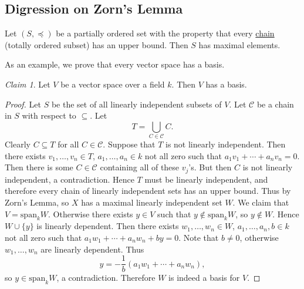 \documentclass[12pt]{article}
\theoremstyle{definition}
\theoremstyle{remark}
\newtheorem*{claim}{Claim}
\begin{document}
\subsection{Digression on Zorn's Lemma}
Let $(S,\preceq)$ be a partially ordered set with the property that every \underline{chain} (totally ordered subset) has an upper bound. Then $S$ has maximal elements.

As an example, we prove that every vector space has a basis. 
\begin{claim}
    Let $V$ be a vector space over a field $k$. Then $V$ has a basis.
\end{claim}
\begin{proof}
    Let $S$ be the set of all linearly independent subsets of $V$. Let $\mathcal{C}$ be a chain in $S$ with respect to $\subseteq$. Let 
    \begin{equation}
        T=\bigcup\limits_{C\in\mathcal{C}}C.
    \end{equation}
    Clearly $C\subseteq T$ for all $C\in\mathcal{C}$. Suppose that $T$ is not linearly independent. Then there exists $v_1,\dotsc,v_n\in T$, $a_1,\dotsc,a_n\in k$ not all zero such that $a_1v_1+\dotsb+a_nv_n=0$. Then there is some $C\in\mathcal{C}$ containing all of these $v_j$'s. But then $C$ is not linearly independent, a contradiction. Hence $T$ must be linearly independent, and therefore every chain of linearly independent sets has an upper bound. Thus by Zorn's Lemma, so $X$ has a maximal linearly independent set $W$. We claim that $V=\mathrm{span}_kW$. Otherwise there exists $y\in V$ such that $y\notin\mathrm{span}_kW$, so $y\notin W$. Hence $W\cup\{y\}$ is linearly dependent. Then there exists $w_1,\dotsc,w_n\in W$, $a_1,\dotsc,a_n,b\in k$ not all zero such that $a_1w_1+\dotsb+a_nw_n+by=0$. Note that $b\neq0$, otherwise $w_1,\dotsc,w_n$ are linearly dependent. Thus 
    \begin{equation}
        y=-\frac{1}{b}(a_1w_1+\dotsb+a_nw_n),
    \end{equation}
    so $y\in\mathrm{span}_kW$, a contradiction. Therefore $W$ is indeed a basis for $V$.
\end{proof}
\end{document}
